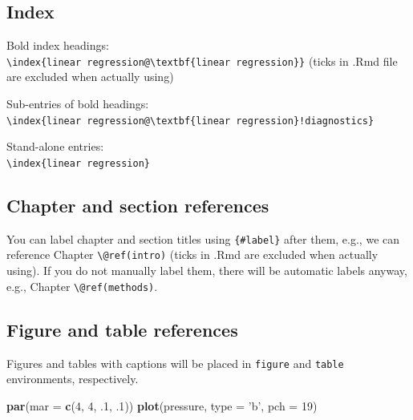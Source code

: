 \documentclass[]{book}
\newenvironment{Shaded}{\begin{snugshade}}{\end{snugshade}}
\newcommand{\DataTypeTok}[1]{\textcolor[rgb]{0.13,0.29,0.53}{#1}}
\newcommand{\DecValTok}[1]{\textcolor[rgb]{0.00,0.00,0.81}{#1}}
\newcommand{\FloatTok}[1]{\textcolor[rgb]{0.00,0.00,0.81}{#1}}
\newcommand{\KeywordTok}[1]{\textcolor[rgb]{0.13,0.29,0.53}{\textbf{#1}}}
\newcommand{\NormalTok}[1]{#1}
\newcommand{\StringTok}[1]{\textcolor[rgb]{0.31,0.60,0.02}{#1}}
\begin{document}
\hypertarget{index}{%
\subsection{Index}\label{index}}

Bold index headings:\\
\texttt{\textbackslash{}index\{linear\ regression@\textbackslash{}textbf\{linear\ regression\}\}} (ticks in .Rmd file are excluded when actually using)

Sub-entries of bold headings:\\
\texttt{\textbackslash{}index\{linear\ regression@\textbackslash{}textbf\{linear\ regression\}!diagnostics\}}

Stand-alone entries:\\
\texttt{\textbackslash{}index\{linear\ regression\}}

\hypertarget{chapter-and-section-references}{%
\subsection{Chapter and section references}\label{chapter-and-section-references}}

You can label chapter and section titles using \texttt{\{\#label\}} after them, e.g., we can reference Chapter \texttt{\textbackslash{}@ref(intro)} (ticks in .Rmd are excluded when actually using). If you do not manually label them, there will be automatic labels anyway, e.g., Chapter \texttt{\textbackslash{}@ref(methods)}.

\hypertarget{figure-and-table-references}{%
\subsection{Figure and table references}\label{figure-and-table-references}}

Figures and tables with captions will be placed in \texttt{figure} and \texttt{table} environments, respectively.

\begin{Shaded}
\begin{Highlighting}[]
\KeywordTok{par}\NormalTok{(}\DataTypeTok{mar =} \KeywordTok{c}\NormalTok{(}\DecValTok{4}\NormalTok{, }\DecValTok{4}\NormalTok{, }\FloatTok{.1}\NormalTok{, }\FloatTok{.1}\NormalTok{))}
\KeywordTok{plot}\NormalTok{(pressure, }\DataTypeTok{type =} \StringTok{'b'}\NormalTok{, }\DataTypeTok{pch =} \DecValTok{19}\NormalTok{)}
\end{Highlighting}
\end{Shaded}
\end{document}
